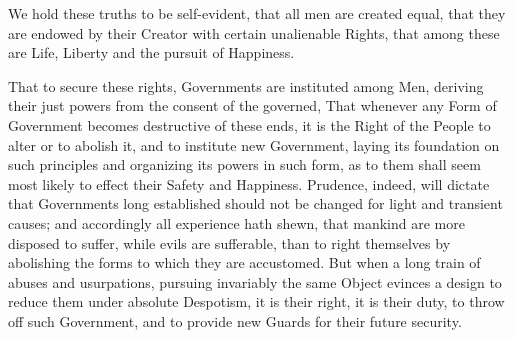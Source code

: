 
\par We hold these truths to be self-evident, that all men are created equal, that they are endowed by their Creator with certain unalienable Rights, that among these are Life, Liberty and the pursuit of Happiness.
\par That to secure these rights, Governments are instituted among Men, deriving their just powers from the consent of the governed, That whenever any Form of Government becomes destructive of these ends, it is the Right of the People to alter or to abolish it, and to institute new Government, laying its foundation on such principles and organizing its powers in such form, as to them shall seem most likely to effect their Safety and Happiness. Prudence, indeed, will dictate that Governments long established should not be changed for light and transient causes; and accordingly all experience hath shewn, that mankind are more disposed to suffer, while evils are sufferable, than to right themselves by abolishing the forms to which they are accustomed. But when a long train of abuses and usurpations, pursuing invariably the same Object evinces a design to reduce them under absolute Despotism, it is their right, it is their duty, to throw off such Government, and to provide new Guards for their future security. 